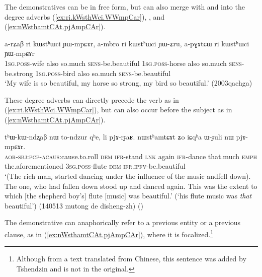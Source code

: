 The demonstratives can be in free form, but can also merge with  and  into the degree adverbs  (\ref{ex:ri.kWsthWci.WWmpCar}), ,  and  (\ref{ex:nWsthamtCAt.pjAmpCAr}).


 \begin{exe}
\ex \label{ex:ri.kWsthWci.WWmpCar}
 \gll  a-rʑaβ ri kɯstʰɯci ɲɯ-mpɕɤr, a-mbro ri kɯstʰɯci ɲɯ-ʑru, a-pɣɤtɕɯ ri kɯstʰɯci ɲɯ-mpɕɤr  \\
 \textsc{1sg}.\textsc{poss}-wife also so.much \textsc{sens}-be.beautiful  \textsc{1sg}.\textsc{poss}-horse also so.much \textsc{sens}-be.strong  \textsc{1sg}.\textsc{poss}-bird also so.much \textsc{sens}-be.beautiful  \\
 \glt `My wife is so beautiful, my horse so strong, my bird so beautiful.' (2003qachga)
 \end{exe}

These degree adverbs can directly precede the verb as in (\ref{ex:ri.kWsthWci.WWmpCar}), but can also occur before the subject as in (\ref{ex:nWsthamtCAt.pjAmpCAr}). 

 \begin{exe}
\ex \label{ex:nWsthamtCAt.pjAmpCAr}
 \gll tʰɯ-kɯ-ndʐaβ nɯ to-ndzur qʰe, li pjɤ-rɟaʁ. nɯstʰamtɕɤt ʑo iɕqʰa ɯ-ɟuli nɯ pjɤ-mpɕɤr. \\
 \textsc{aor}-\textsc{sbj}:\textsc{pcp}-\textsc{acaus}:cause.to.roll \textsc{dem} \textsc{ifr}-stand \textsc{lnk} again \textsc{ifr}-dance that.much \textsc{emph} the.aforementioned \textsc{3sg}.\textsc{poss}-flute \textsc{dem} \textsc{ifr}.\textsc{ipfv}-be.beautiful \\
 \glt `(The rich man$_i$ started dancing under the influence of the music andfell down). The one$_i$ who had fallen down stood up and danced again. This was the extent to which [the shepherd boy's] flute [music] was beautiful.'  (`his flute music was \textit{that} beautiful') (140513 mutong de disheng-zh)
 ()
 \end{exe}
 
 The demonstrative can anaphorically refer to a previous entity or a previous clause, as in (\ref{ex:nWsthamtCAt.pjAmpCAr}), where it is focalized.\footnote{Although from a text translated from Chinese, this sentence was added by Tshendzin and is not in the original.  }



